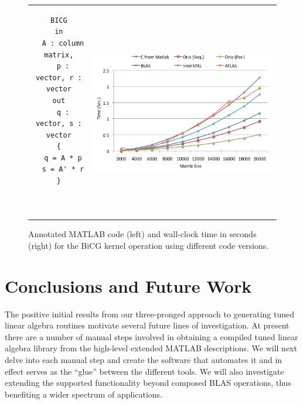 \documentclass[11pt]{article}
\begin{document}
\begin{figure}[htp]
\centering
\begin{tabular}{cc}
\begin{minipage}[b]{.3\textwidth}
\footnotesize
\begin{verbatim}
BICG
in
  A : column matrix,
  p : vector, r : vector
out
  q : vector, s : vector
{
  q = A * p
  s = A' * r
}



\end{verbatim}
\end{minipage}
&
\begin{minipage}[b]{.6\textwidth}
\includegraphics[width=\textwidth]{figures/bicgkernel.png}
\end{minipage}\\
\end{tabular}
\caption{Annotated MATLAB code (left) and wall-clock time in seconds (right) for the BiCG kernel operation using different code versions.}
\label{fig:bicgkernel}
\end{figure}

\section{Conclusions and Future Work}

The positive initial results from our three-pronged approach to generating tuned linear algebra routines motivate several future lines of investigation. At present there are a number of manual steps involved in obtaining a compiled tuned linear algebra library from the high-level extended MATLAB descriptions. We will next delve into each manual step and create the software that automates it and in effect serves as the ``glue'' between the different tools. We will also investigate extending the supported functionality beyond composed BLAS operations, thus benefiting a wider spectrum of applications.
\end{document}
